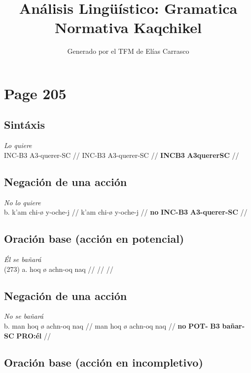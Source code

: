 \documentclass{article}%
\title{Análisis Lingüístico: Gramatica Normativa Kaqchikel}%
\author{Generado por el TFM de Elías Carrasco}%
\begin{document}
%
\normalsize%
\maketitle%
\section{Page 205}%
\label{sec:Page205}%
\subsection{Sintáxis}%
\label{subsec:Sintxis}%

%
\par\medskip%
\ex
\textit{Lo quiere} \\
\begingl
\gla INC-B3 A3-querer-SC //
\glb INC-B3 A3-querer-SC //
\glc \textbf{INC}\textbf{B3} \textbf{A3}\textbf{querer}\textbf{SC} //
\endgl
\xe
%
\medskip%
\subsection{Negación de una acción}%
\label{subsec:Negacindeunaaccin}%

%
\par\medskip%
\ex
\textit{No lo quiere} \\
\begingl
\gla b. k’am chi-ø y-oche-j //
\glb k’am chi-ø y-oche-j //
\glc \textbf{no} \textbf{INC-}\textbf{B3} \textbf{A3-}\textbf{querer-}\textbf{SC} //
\endgl
\xe
%
\medskip%
\subsection{Oración base (acción en potencial)}%
\label{subsec:Oracinbase(accinenpotencial)}%

%
\par\medskip%
\ex
\textit{Él se bañará} \\
\begingl
\gla (273) a. hoq ø achn-oq naq //
\glb  //
\glc  //
\endgl
\xe
%
\medskip%
\subsection{Negación de una acción}%
\label{subsec:Negacindeunaaccin}%

%
\par\medskip%
\ex
\textit{No se bañará} \\
\begingl
\gla b. man hoq ø achn-oq naq //
\glb man hoq ø achn-oq naq //
\glc \textbf{no} \textbf{POT-} \textbf{B3} \textbf{bañar-}\textbf{SC} \textbf{PRO:él} //
\endgl
\xe
%
\medskip%
\subsection{Oración base (acción en incompletivo)}%
\label{subsec:Oracinbase(accinenincompletivo)}%
\end{document}
